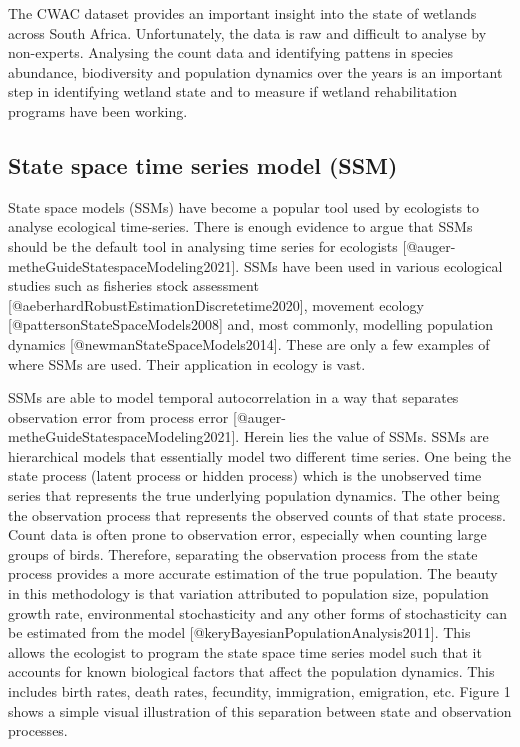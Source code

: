 \documentclass[
]{article}
\begin{document}
The CWAC dataset provides an important insight into the state of
wetlands across South Africa. Unfortunately, the data is raw and
difficult to analyse by non-experts. Analysing the count data and
identifying pattens in species abundance, biodiversity and population
dynamics over the years is an important step in identifying wetland
state and to measure if wetland rehabilitation programs have been
working.

\hypertarget{state-space-time-series-model-ssm}{%
\subsection{State space time series model
(SSM)}\label{state-space-time-series-model-ssm}}

State space models (SSMs) have become a popular tool used by ecologists
to analyse ecological time-series. There is enough evidence to argue
that SSMs should be the default tool in analysing time series for
ecologists {[}@auger-metheGuideStatespaceModeling2021{]}. SSMs have been
used in various ecological studies such as fisheries stock assessment
{[}@aeberhardRobustEstimationDiscretetime2020{]}, movement ecology
{[}@pattersonStateSpaceModels2008{]} and, most commonly, modelling
population dynamics {[}@newmanStateSpaceModels2014{]}. These are only a
few examples of where SSMs are used. Their application in ecology is
vast.

SSMs are able to model temporal autocorrelation in a way that separates
observation error from process error
{[}@auger-metheGuideStatespaceModeling2021{]}. Herein lies the value of
SSMs. SSMs are hierarchical models that essentially model two different
time series. One being the state process (latent process or hidden
process) which is the unobserved time series that represents the true
underlying population dynamics. The other being the observation process
that represents the observed counts of that state process. Count data is
often prone to observation error, especially when counting large groups
of birds. Therefore, separating the observation process from the state
process provides a more accurate estimation of the true population. The
beauty in this methodology is that variation attributed to population
size, population growth rate, environmental stochasticity and any other
forms of stochasticity can be estimated from the model
{[}@keryBayesianPopulationAnalysis2011{]}. This allows the ecologist to
program the state space time series model such that it accounts for
known biological factors that affect the population dynamics. This
includes birth rates, death rates, fecundity, immigration, emigration,
etc. Figure 1 shows a simple visual illustration of this separation
between state and observation processes.
\end{document}
